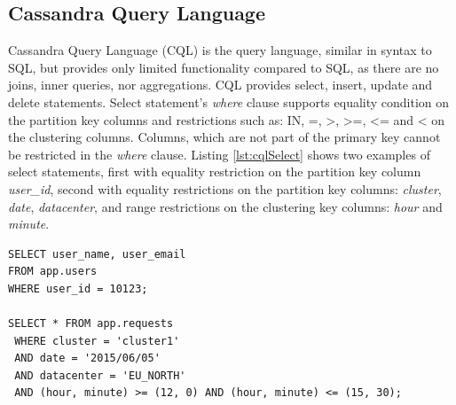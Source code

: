 

\subsection{Cassandra Query Language}
\label{sec:theory:cassandra:cql}
Cassandra Query Language (CQL) is the query language, similar in syntax to SQL, but provides only limited functionality compared to SQL, as there are no joins, inner queries, nor aggregations. CQL provides select, insert, update and delete statements. Select statement's \emph{where} clause supports equality condition on the partition key columns and restrictions such as: IN, =, >, >=, <= and < on the clustering columns. Columns, which are not part of the primary key cannot be restricted in the \emph{where} clause. Listing \ref{lst:cqlSelect} shows two examples of select statements, first with equality restriction on the partition key column \emph{user_id}, second with equality restrictions on the partition key columns: \emph{cluster}, \emph{date}, \emph{datacenter}, and range restrictions on the clustering key columns: \emph{hour} and \emph{minute}.

\begin{lstlisting}[style=outcode,label={lst:cqlSelect},caption={Examples of CQL select statements}]
SELECT user_name, user_email 
FROM app.users 
WHERE user_id = 10123;
    
SELECT * FROM app.requests
 WHERE cluster = 'cluster1'
 AND date = '2015/06/05'
 AND datacenter = 'EU_NORTH'
 AND (hour, minute) >= (12, 0) AND (hour, minute) <= (15, 30);
\end{lstlisting}

 
